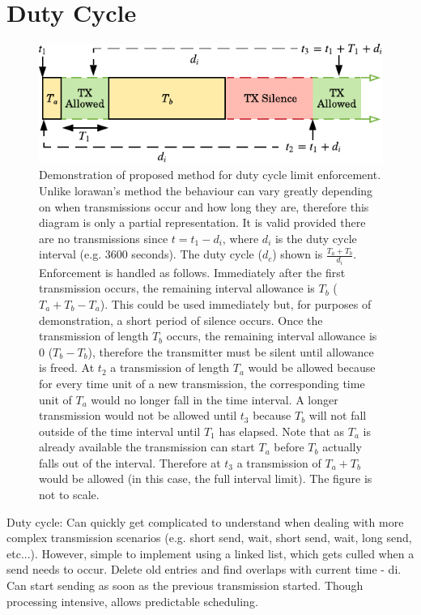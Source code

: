 \section{Duty Cycle}
\begin{figure}[H]
    \centering
   	\includegraphics{Figures/duty_cycle_proposed.pdf}
    \caption[Proposed duty cycle enforcement method]{
    Demonstration of proposed method for duty cycle limit enforcement. Unlike \ac{lorawan}'s method the behaviour can vary greatly depending on when transmissions occur and how long they are, therefore this diagram is only a partial representation. It is valid provided there are no transmissions since $t=t_1-d_i$, where $d_i$ is the duty cycle interval (e.g. 3600 seconds). The duty cycle ($d_c$) shown is $\frac{T_a + T_b}{d_i}$. Enforcement is handled as follows. Immediately after the first transmission occurs, the remaining interval allowance is $T_b$ ($T_a+T_b-T_a$). This could be used immediately but, for purposes of demonstration, a short period of silence occurs. Once the transmission of length $T_b$ occurs, the remaining interval allowance is 0 ($T_b - T_b$), therefore the transmitter must be silent until allowance is freed. At $t_2$ a transmission of length $T_a$ would be allowed because for every time unit of a new transmission, the corresponding time unit of $T_a$ would no longer fall in the time interval. A longer transmission would not be allowed until $t_3$ because $T_b$ will not fall outside of the time interval until $T_1$ has elapsed. Note that as $T_a$ is already available the transmission can start $T_a$ before $T_b$ actually falls out of the interval. Therefore at $t_3$ a transmission of $T_a + T_b$ would be allowed (in this case, the full interval limit). The figure is not to scale.    
    }
    \label{fig:proposed_duty_cycle}
\end{figure}



Duty cycle:
Can quickly get complicated to understand when dealing with more complex transmission scenarios  (e.g. short send, wait, short send, wait, long send, etc...). However, simple to implement using a linked list, which gets culled when a send needs to occur. Delete old entries and find overlaps with current time - di. Can start sending as soon as the previous transmission started. Though processing intensive, allows predictable scheduling.

